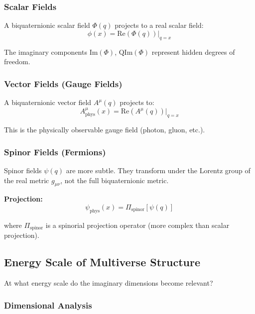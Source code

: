 \subsubsection{Scalar Fields}

A biquaternionic scalar field $\Phi(q)$ projects to a real scalar field:
\begin{equation}
\phi(x) = \text{Re}(\Phi(q))\Big|_{q=x}
\end{equation}

The imaginary components $\text{Im}(\Phi)$, $\text{QIm}(\Phi)$ represent hidden degrees of freedom.

\subsubsection{Vector Fields (Gauge Fields)}

A biquaternionic vector field $A^{\mu}(q)$ projects to:
\begin{equation}
A^{\mu}_{\text{phys}}(x) = \text{Re}(A^{\mu}(q))\Big|_{q=x}
\end{equation}

This is the physically observable gauge field (photon, gluon, etc.).

\subsubsection{Spinor Fields (Fermions)}

Spinor fields $\psi(q)$ are more subtle. They transform under the Lorentz group of the real metric $g_{\mu\nu}$, not the full biquaternionic metric.

\textbf{Projection:}
\begin{equation}
\psi_{\text{phys}}(x) = \Pi_{\text{spinor}}[\psi(q)]
\end{equation}

where $\Pi_{\text{spinor}}$ is a spinorial projection operator (more complex than scalar projection).

\subsection{Energy Scale of Multiverse Structure}

At what energy scale do the imaginary dimensions become relevant?

\subsubsection{Dimensional Analysis}

